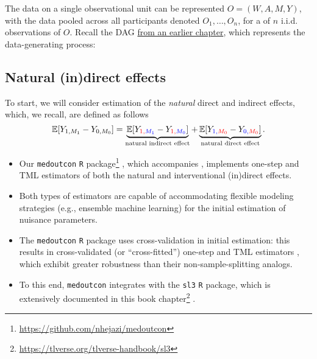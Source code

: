 \documentclass[
  12pt,
]{book}
\newcommand{\passthrough}[1]{#1}
\providecommand{\tightlist}{%
  \setlength{\itemsep}{0pt}\setlength{\parskip}{0pt}}
\renewcommand{\href}[2]{#2\footnote{\url{#1}}}
\theoremstyle{definition}
\theoremstyle{definition}
\theoremstyle{definition}
\newcommand{\E}{\mathbb{E}}
\newcommand{\1}{\mathbbm{1}}
\begin{document}
The data on a single observational unit can be represented \(O = (W, A, M, Y)\),
with the data pooled across all participants denoted \(O_1, \ldots, O_n\), for a
of \(n\) i.i.d. observations of \(O\). Recall the DAG \protect\hyperlink{estimands}{from an earlier
chapter}, which represents the data-generating process:

\hypertarget{natural-indirect-effects}{%
\subsection{Natural (in)direct effects}\label{natural-indirect-effects}}

To start, we will consider estimation of the \emph{natural} direct and indirect effects,
which, we recall, are defined as follows
\begin{equation*}
  \E[Y_{1,M_1} - Y_{0,M_0}] = \underbrace{\E[Y_{\color{red}{1},\color{blue}{M_1}} -
    Y_{\color{red}{1},\color{blue}{M_0}}]}_{\text{natural indirect effect}} +
    \underbrace{\E[Y_{\color{blue}{1},\color{red}{M_0}} -
    Y_{\color{blue}{0},\color{red}{M_0}}]}_{\text{natural direct effect}}.
\end{equation*}

\begin{itemize}
\tightlist
\item
  Our \href{https://github.com/nhejazi/medoutcon}{\passthrough{\lstinline!medoutcon!} \passthrough{\lstinline!R!} package}
  \citep{hejazi2021medoutcon}, which accompanies \citet{diaz2020nonparametric}, implements
  one-step and TML estimators of both the natural and interventional (in)direct
  effects.
\item
  Both types of estimators are capable of accommodating flexible modeling
  strategies (e.g., ensemble machine learning) for the initial estimation of
  nuisance parameters.
\item
  The \passthrough{\lstinline!medoutcon!} \passthrough{\lstinline!R!} package uses cross-validation in initial estimation: this
  results in cross-validated (or ``cross-fitted'') one-step and TML estimators
  \citep{klaassen1987consistent, zheng2011cross, chernozhukov2018double}, which
  exhibit greater robustness than their non-sample-splitting analogs.
\item
  To this end, \passthrough{\lstinline!medoutcon!} integrates with the \passthrough{\lstinline!sl3!} \passthrough{\lstinline!R!} package, which is
  extensively documented in this \href{https://tlverse.org/tlverse-handbook/sl3}{book
  chapter} \citep{vdl2022targeted}.
\end{itemize}
\end{document}

